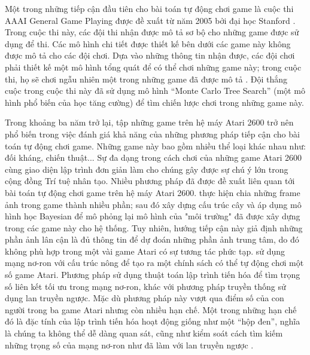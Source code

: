 Một trong những tiếp cận đầu tiên cho bài toán tự động chơi game là cuộc thi AAAI General Game Playing được đề xuất từ năm 2005 bởi đại học Stanford \cite{genesereth2005general}.
Trong cuộc thi này, các đội thi nhận được mô tả sơ bộ cho những game được sử dụng để thi.
Các mô hình chi tiết được thiết kế bên dưới các game này không được mô tả cho các đội chơi.
Dựa vào những thông tin nhận được, các đội chơi phải thiết kế một mô hình tổng quát để có thể chơi những game này; trong cuộc thi, họ sẽ chơi ngẫu nhiên một trong những game đã được mô tả \cite{genesereth2005general}.
Đội thắng cuộc trong cuộc thi này đã sử dụng mô hình ``Monte Carlo Tree Search'' (một mô hình phổ biến của học tăng cường) để tìm chiến lược chơi trong những game này.

Trong khoảng ba năm trở lại, tập những game trên hệ máy Atari 2600 trở nên phổ biến trong việc đánh giá khả năng của những phương pháp tiếp cận cho bài toán tự động chơi game.
Những game này bao gồm nhiều thể loại khác nhau như: đối kháng, chiến thuật...
Sự đa dạng trong cách chơi của những game Atari 2600 cùng giao diện lập trình đơn giản làm cho chúng gây được sự chú ý lớn trong cộng đồng Trí tuệ nhân tạo.
Nhiều phương pháp đã được đề xuất liên quan tới bài toán tự động chơi game trên hệ máy Atari 2600. \cite{bellemare2013bayesian,icml2014c2_bellemare14} thực hiện chia những frame ảnh trong game thành nhiều phần; sau đó xây dựng cấu trúc cây  và áp dụng mô hình học Bayesian để mô phỏng lại mô hình của "môi trường" đã được xây dựng trong các game này cho hệ thống.
Tuy nhiên, hướng tiếp cận này giả định những phần ảnh lân cận là đủ thông tin để dự đoán những phần ảnh trung tâm, do đó không phù hợp trong một vài game Atari có sự tương tác phức tạp.
\cite{hausknecht2014neuroevolution} sử dụng mạng nơ-ron với cấu trúc nông để tạo ra một chính sách có thể tự động chơi một số game Atari.
Phương pháp sử dụng thuật toán lập trình tiến hóa để tìm trọng số liên kết tối ưu trong mạng nơ-ron, khác với phương pháp truyền thống sử dụng lan truyền ngược.
Mặc dù phương pháp này vượt qua điểm số của con người trong ba game Atari nhưng còn nhiều hạn chế.
Một trong những hạn chế đó là đặc tính của lập trình tiến hóa hoạt động giống như một ``hộp đen'', nghĩa là chúng ta không thể dễ dàng quan sát, cũng như kiểm soát cách tìm kiếm những trọng số của mạng nơ-ron như đã làm với lan truyền ngược \cite{risi2014neuroevolution}.

